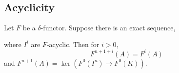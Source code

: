 \documentclass[12pt]{article}
\begin{document}
\subsection{Acyclicity}

\begin{lemma}
Let $F$ be a $\delta$-functor. Suppose there is an exact sequence,
\begin{center}
\end{center}
where $I^i$ are $F$-acyclic. Then for $i > 0$,
\[ F^{n + 1 + i}(A) = F^i(A) \]
and $F^{n+1}(A) = \ker{(F^0(I^{n}) \to F^0(K))}$. 
\end{lemma}
\end{document}
